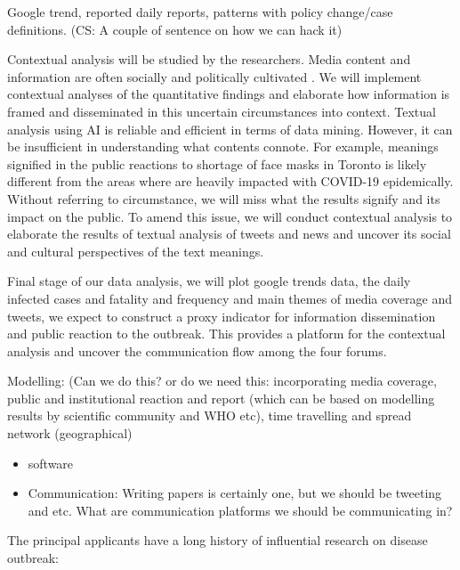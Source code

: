 Google trend, reported daily reports, patterns with policy change/case definitions. (CS: A couple of sentence on how we can hack it)

Contextual analysis will be studied by the researchers.  Media content and information are often socially and politically cultivated \cite{}.  We will implement contextual analyses of the quantitative findings and elaborate how information is framed and disseminated in this uncertain circumstances into context.  Textual analysis using AI is reliable and efficient in terms of data mining.  However, it can be insufficient in understanding what contents connote.  For example, meanings signified in the public reactions to shortage of face masks in Toronto is likely different from  the areas where are heavily impacted with COVID-19 epidemically.  Without referring to circumstance, we will miss what the results signify and its impact on the public.  To amend this issue, we will conduct contextual analysis \citep{} to elaborate the results of textual analysis of tweets and news and uncover its social and cultural perspectives of the text meanings.

Final stage of our data analysis,  we will plot google trends data, the daily infected cases and fatality and frequency and main themes of media coverage and tweets,  we expect to construct a proxy indicator for information dissemination and public reaction to the outbreak.  This provides a platform for the contextual analysis and uncover the communication flow among the four forums.



Modelling: (Can we do this? or do we need this: incorporating media coverage, public and institutional reaction and report (which can be based on modelling results by scientific community and WHO etc), time travelling and spread network (geographical)


\begin{itemize}
\item{software}
\item{Communication: Writing papers is certainly one, but we should be tweeting and etc. What are communication platforms we should be communicating in?}
\end{itemize}


The principal applicants have a long history of influential research on disease outbreak: 

